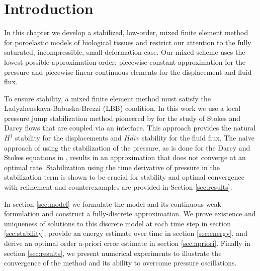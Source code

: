 
\section {Introduction}
\label{sec:intro}

In this chapter we develop a stabilized, low-order, mixed finite element method for poroelastic models of biological tissues and restrict our attention to the fully saturated, incompressible, small deformation case. Our mixed scheme uses the lowest possible approximation order: piecewise constant approximation for the pressure and piecewise linear continuous elements for the displacement and fluid flux.

To ensure stability, a mixed finite element method must satisfy the \newline Ladyzhenskaya-Babuska-Brezzi (LBB) condition. In this work we use a local pressure jump stabilization method pioneered by \cite{burman2007unified} for the study of Stokes and Darcy flows that are coupled via an interface. This approach provides the natural $H^{1}$ stability for the displacements and $H{div}$ stability for the fluid flux. The naive approach of using the stabilization of the pressure, as is done for the Darcy and Stokes equations in \cite{burman2007unified}, results in an approximation that does not converge at an optimal rate. Stabilization using the time derivative of pressure in the stabilization term is shown to be crucial for stability and optimal convergence with refinement and counterexamples are provided in Section \ref{sec:results}.

In section \ref{sec:model} we formulate the model and its continuous weak formulation and construct a fully-discrete approximation. We prove existence and uniqueness of solutions to this discrete model at each time step in section \ref{sec:stability}, provide an energy estimate over time in section \ref{sec:energy}, and derive an optimal order a-priori error estimate in section \ref{sec:apriori}. Finally in section \ref{sec:results}, we present numerical experiments to illustrate the convergence of the method and its ability to overcome pressure oscillations.







